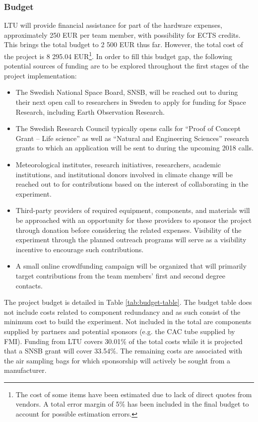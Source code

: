 \pagebreak
\subsubsection{Budget}
LTU will provide financial assistance for part of the hardware expenses, approximately 250 EUR per team member, with possibility for ECTS credits. This brings the total budget to 2 500 EUR thus far. However, the total cost of the project is 8 295.04 EUR\footnote{The cost of some items have been estimated due to lack of direct quotes from vendors. A total error margin of 5\% has been included in the final budget to account for possible estimation errors.}. In order to fill this budget gap, the following potential sources of funding are to be explored throughout the first stages of the project implementation:

\begin{itemize}
    \item The Swedish National Space Board, SNSB, will be reached out to during their next open call to researchers in Sweden to apply for funding for Space Research, including Earth Observation Research.
    \item The Swedish Research Council typically opens calls for \enquote{Proof of Concept Grant – Life science} as well as \enquote{Natural and Engineering Sciences} research grants to which an application will be sent to during the upcoming 2018 calls.
    \item Meteorological institutes, research initiatives, researchers, academic institutions, and institutional donors involved in climate change will be reached out to for contributions based on the interest of collaborating in the experiment.
    \item Third-party providers of required equipment, components, and materials will be approached with an opportunity for these providers to sponsor the project through donation before considering the related expenses. Visibility of the experiment through the planned outreach programs will serve as a visibility incentive to encourage such contributions.
    \item A small online crowdfunding campaign will be organized that will primarily target contributions from the team members' first and second degree contacts.
\end{itemize}

The project budget is detailed in Table \ref{tab:budget-table}. The budget table does not include costs related to component redundancy and as such consist of the minimum cost to build the experiment. Not included in the total are components supplied by partners and potential sponsors (e.g. the CAC tube supplied by FMI). Funding from LTU covers 30.01\% of the total costs while it is projected that a SNSB grant will cover 33.54\%. The remaining costs are associated with the air sampling bags for which sponsorship will actively be sought from a manufacturer.

